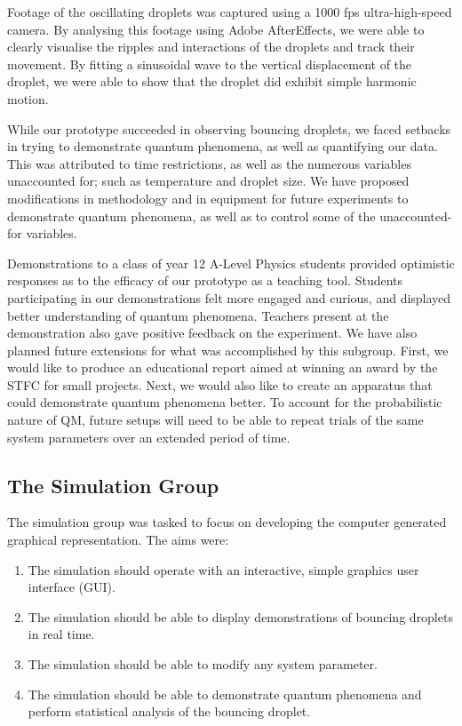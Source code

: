 Footage of the oscillating droplets was captured using a 1000 fps ultra-high-speed camera. By analysing this footage using Adobe AfterEffects, we were able to clearly visualise the ripples and interactions of the droplets and track their movement. By fitting a sinusoidal wave to the vertical displacement of the droplet, we were able to show that the droplet did exhibit simple harmonic motion. 

While our prototype succeeded in observing bouncing droplets, we faced setbacks in trying to demonstrate quantum phenomena, as well as quantifying our data. This was attributed to time restrictions, as well as the numerous variables unaccounted for; such as temperature and droplet size. We have proposed modifications in methodology and in equipment for future experiments to demonstrate quantum phenomena, as well as to control some of the unaccounted-for variables.

Demonstrations to a class of year 12 A-Level Physics students provided optimistic responses as to the efficacy of our prototype as a teaching tool. Students participating in our demonstrations felt more engaged and curious, and displayed better understanding of quantum phenomena. Teachers present at the demonstration also gave positive feedback on the experiment. 
We have also planned future extensions for what was accomplished by this subgroup. First, we would like to produce an educational report aimed at winning an award by the STFC for small projects. Next, we would also like to create an apparatus that could demonstrate quantum phenomena better. To account for the probabilistic nature of QM, future setups will need to be able to repeat trials of the same system parameters over an extended period of time.

\subsection*{The Simulation Group}
The simulation group was tasked to focus on developing the computer generated graphical representation. The aims were:

\begin{enumerate}
    \item The simulation should operate with an interactive, simple graphics user interface (GUI).
    \item The simulation should be able to display demonstrations of bouncing
droplets in real time.
    \item The simulation should be able to modify any system parameter.
\item The simulation should be able to demonstrate quantum phenomena and perform statistical analysis of the bouncing droplet. 
\end{enumerate}

